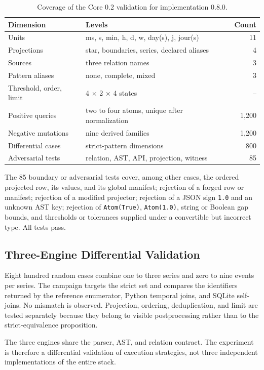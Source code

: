 \documentclass[11pt,a4paper]{article}
\newcommand{\code}[1]{\texttt{#1}}
\begin{document}
\begin{table}[H]
\centering
\caption{Coverage of the Core 0.2 validation for implementation 0.8.0.}
\label{tab:compiler-coverage}
\small
\begin{tabularx}{\textwidth}{@{}p{3.3cm}Xr@{}}
\toprule
Dimension & Levels & Count \\
\midrule
Units & ms, s, min, h, d, w, day(s), j, jour(s) & 11 \\
Projections & star, boundaries, series, declared aliases & 4 \\
Sources & three relation names & 3 \\
Pattern aliases & none, complete, mixed & 3 \\
Threshold, order, limit & 4 $\times$ 2 $\times$ 4 states & -- \\
Positive queries & two to four atoms, unique after normalization & 1,200 \\
Negative mutations & nine derived families & 1,200 \\
Differential cases & strict-pattern dimensions & 800 \\
Adversarial tests & relation, AST, API, projection, witness & 85 \\
\bottomrule
\end{tabularx}
\end{table}

The 85 boundary or adversarial tests cover, among other cases, the ordered projected row, its values, and its global manifest; rejection of a forged row or manifest; rejection of a modified projector; rejection of a JSON sign \code{1.0} and an unknown AST key; rejection of \code{Atom(True)}, \code{Atom(1.0)}, string or Boolean gap bounds, and thresholds or tolerances supplied under a convertible but incorrect type. All tests pass.

\subsection{Three-Engine Differential Validation}

Eight hundred random cases combine one to three series and zero to nine events per series. The campaign targets the strict set and compares the identifiers returned by the reference enumerator, Python temporal joins, and SQLite self-joins. No mismatch is observed. Projection, ordering, deduplication, and limit are tested separately because they belong to visible postprocessing rather than to the strict-equivalence proposition.

The three engines share the parser, AST, and relation contract. The experiment is therefore a differential validation of execution strategies, not three independent implementations of the entire stack.
\end{document}
